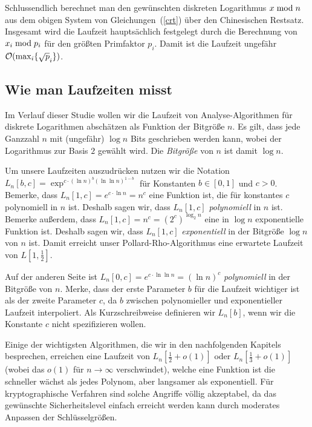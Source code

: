 \begin{refsegment}
Schlussendlich berechnet man den gewünschten diskreten Logarithmus $x \hspace{1mm}{\rm mod}\hspace{1mm} n$ aus dem obigen System von Gleichungen~(\ref{crt}) über den Chinesischen Restsatz.
Insgesamt wird die Laufzeit hauptsächlich festgelegt durch die Berechnung von $x_i \hspace{1mm}{\rm mod}\hspace{1mm} p_i$ für den größten Primfaktor $p_i$. Damit ist die Laufzeit ungefähr ${\cal O}(\max_i\{\sqrt p_i\})$.


\subsection{Wie man Laufzeiten misst}
Im Verlauf dieser Studie wollen wir die Laufzeit von Analyse-Algorithmen für diskrete Logarithmen abschätzen als Funktion der Bitgröße $n$. Es gilt, dass jede Ganzzahl $n$ mit (ungefähr) $\log n$ Bits geschrieben werden kann, wobei der Logarithmus zur Basis $2$ gewählt wird. Die {\em Bitgröße} von $n$ ist damit $\log n$.

Um unsere Laufzeiten auszudrücken nutzen wir die Notation $L_n[b,c]=\exp^{c \cdot (\ln n)^{b}(\ln\ln n)^{1-b}}$ für Konstanten $b \in [0,1]$ und $c>0$. Bemerke, dass $L_n[1,c]=e^{c \cdot \ln n} = n^c$ eine Funktion ist, die für konstantes $c$ polynomiell in $n$ ist. Deshalb sagen wir, dass $L_n[1,c]$ {\em polynomiell} in $n$ ist. Bemerke außerdem, dass $L_n[1,c]=n^c = (2^{c})^{\log_2 n}$ eine in $\log n$ exponentielle Funktion ist. Deshalb sagen wir, dass $L_n[1,c]$ {\em exponentiell} in der Bitgröße $\log n$ von $n$ ist. Damit erreicht unser Pollard-Rho-Algorithmus eine erwartete Laufzeit von $L[1,\frac 1 2]$.

Auf der anderen Seite ist $L_n[0,c] = e^{c \cdot \ln\ln n} = (\ln n)^c$ {\em polynomiell} in der Bitgröße von $n$. Merke, dass der erste Parameter $b$ für die Laufzeit wichtiger ist als der zweite Parameter $c$, da $b$ zwischen polynomieller und exponentieller Laufzeit interpoliert. Als Kurzschreibweise definieren wir $L_n[b]$, wenn wir die Konstante $c$ nicht spezifizieren wollen.

Einige der wichtigsten Algorithmen, die wir in den nachfolgenden Kapitels besprechen, erreichen eine Laufzeit von $L_n[\frac 1 2 +o(1)]$ oder $L_n[\frac 1 3 +o(1)]$ (wobei das $o(1)$ für $n\to\infty$ verschwindet), welche eine Funktion ist die schneller wächst als jedes Polynom, aber langsamer als exponentiell. Für kryptographische Verfahren sind solche Angriffe völlig akzeptabel, da das gewünschte Sicherheitslevel einfach erreicht werden kann durch moderates Anpassen der Schlüsselgrößen.


\end{refsegment}
